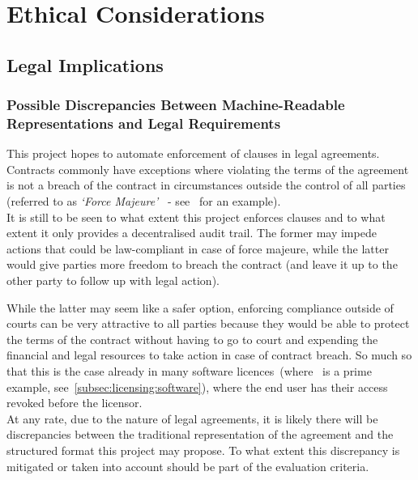 
\chapter{Ethical Considerations}\label{ch:ethical}


\section{Legal Implications}\label{sec:legal-implications}

\subsection{Possible Discrepancies Between Machine-Readable Representations and Legal Requirements}
\label{subsec:legal-discrepancies}

This project hopes to automate enforcement of clauses in legal agreements.
Contracts commonly have exceptions where violating the terms of the agreement is not a breach of the
contract in circumstances outside the control of all parties (referred to as \textit{`Force
Majeure'}~\cite{forceMajeureDefinition} - see~\cite[]{jetbrainsEduLicence} for an
example).\\

It is still to be seen to what extent this project enforces clauses and to what extent it only
provides a decentralised audit trail.
The former may impede actions that could be law-compliant in case of force majeure, while the latter
would give parties more freedom to breach the contract (and leave it up to the other party to follow
up with legal action).

While the latter may seem like a safer option, enforcing compliance outside of courts can be very
attractive to all parties because they would be able to protect the terms of the contract without
having to go to court and expending the financial and legal resources to take action in case of
contract breach.
So much so that this is the case already in many software licences~(where~\cite{jetbrainsEduLicence}
is a prime example, see~\ref{subsec:licensing:software}), where the end user has their access
revoked before the licensor.\\

At any rate, due to the nature of legal agreements, it is likely there will be discrepancies
between the traditional representation of the agreement and the structured format this project
may propose.
To what extent this discrepancy is mitigated or taken into account should be part of the
evaluation criteria.

